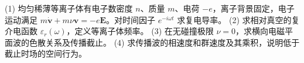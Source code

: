 (1) 均匀稀薄等离子体有电子数密度 \(n\)、质量 \(m\)、电荷 \(-e\)，离子背景固定，电子运动满足 \(m\dot{\boldsymbol v}+m\nu\boldsymbol v=-e\boldsymbol E\)。对时间因子 \(e^{-i\omega t}\) 求复电导率。
(2) 求相对真空的复介电函数 \(\varepsilon_r(\omega)\)，定义等离子体频率。
(3) 在无碰撞极限 \(\nu=0\)，求横向电磁平面波的色散关系及传播截止。
(4) 求传播波的相速度和群速度及其乘积，说明低于截止时场的空间行为。
